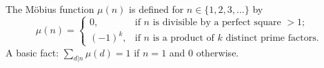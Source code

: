 The Möbius function $\mu(n)$ is defined for $n \in \{1,2,3,\ldots\}$ by $$\mu(n) = \begin{cases} 0, & \text{if } n \text{ is divisible by a perfect square } > 1; \\ (-1)^k, & \text{if } n \text{ is a product of } k \text{ distinct prime factors}. \end{cases}$$ A basic fact: $\sum_{d|n} \mu(d) = 1$ if $n=1$ and 0 otherwise.